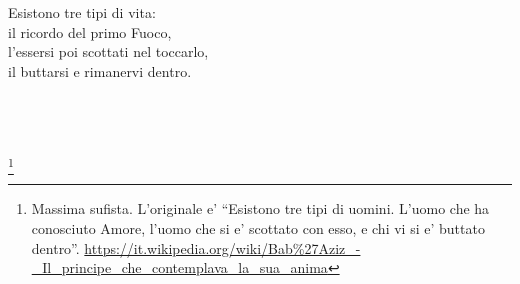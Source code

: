 \begin{vcentered}
    \begin{poem}
        Esistono tre tipi di vita:  \\
        il ricordo del primo Fuoco, \\
        l'essersi poi scottati nel toccarlo, \\
        il buttarsi e rimanervi dentro.\\
    \end{poem}
    \leavevmode\\
    \leavevmode\\
    \leavevmode\\
    \footnote{Massima sufista. L'originale e' ``Esistono tre tipi di uomini. L'uomo che ha conosciuto Amore, l'uomo che si e' scottato con esso, e chi vi si e' buttato dentro''.  \url{https://it.wikipedia.org/wiki/Bab\%27Aziz\_-\_Il\_principe\_che\_contemplava\_la\_sua\_anima}}
\end{vcentered}

